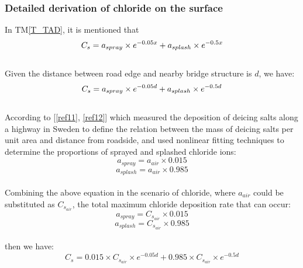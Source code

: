 \documentclass[12pt]{article}
\newcommand{\tref}[1]{TM\ref{#1}}
\newcommand{\reref}[1]{\ref{#1}}
\begin{document}
\subsubsection*{Detailed derivation of chloride on the surface}
In \tref{T_TAD}, it is mentioned that
\[
C_s = a_{spray} \times e^{-0.05x} + a_{splash} \times e^{-0.5x}\\ 
\]
\\
Given the distance between road edge and nearby bridge structure is $d$, we have: 
\[
C_s = a_{spray} \times e^{-0.05d} + a_{splash} \times e^{-0.5d}\\ 
\]
\\
According to [\reref{ref11}, \reref{ref12}] which measured the deposition of deicing salts along a highway in Sweden to define the relation between the mass of deicing salts per unit area and distance from roadside, and used nonlinear fitting techniques to determine the proportions of sprayed and splashed chloride ions:
\[
a_{spray} = a_{air} \times 0.015
\]
\[
a_{splash} = a_{air} \times 0.985
\]
\\
Combining the above equation in the scenario of chloride, where $a_{air}$ could be substituted as $C_{s_{air}}$, the total maximum chloride deposition rate that can occur:
\[
a_{spray} = C_{s_{air}} \times 0.015
\]
\[
a_{splash} = C_{s_{air}} \times 0.985
\]
\\
then we have:
\[
C_s = 0.015 \times C_{s_{air}} \times e^{-0.05d} + 0.985 \times C_{s_{air}} \times  e^{-0.5d}
\]


~\newline
\end{document}

